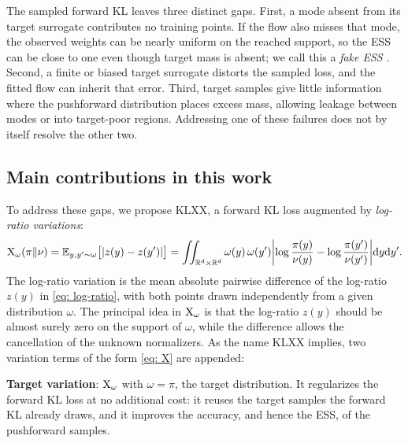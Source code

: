 \documentclass{article}
\begin{document}
The sampled forward KL leaves three distinct gaps. First, a mode absent from its target surrogate contributes no training points. If the flow also misses that mode, the observed weights can be nearly uniform on the reached support, so the ESS can be close to one even though target mass is absent; we call this a \emph{fake ESS} \citep{noe2019boltzmann,midgley2022flow}. Second, a finite or biased target surrogate distorts the sampled loss, and the fitted flow can inherit that error. Third, target samples give little information where the pushforward distribution places excess mass, allowing leakage between modes or into target-poor regions. Addressing one of these failures does not by itself resolve the other two.

\subsection{Main contributions in this work}
To address these gaps, we propose KLXX, a forward KL loss augmented by \emph{log-ratio variations}:
\begin{equation}
	\mathrm{X}_\omega(\pi\|\nu) = \mathbb E_{y,y'\sim \omega} \big[|z(y)-z(y')|\big] = \iint_{\mathbb R^d\times\mathbb R^d} \omega(y)\,\omega(y')
	\biggl|\log\frac{\pi(y)}{\nu(y)} - \log\frac{\pi(y')}{\nu(y')}\biggr| \mathrm{d} y\mathrm{d} y'.
	\label{eq: X}
\end{equation}
The log-ratio variation is the mean absolute pairwise difference of the log-ratio $z(y)$ in \eqref{eq: log-ratio}, with both points drawn independently from a given distribution $\omega$.
The principal idea in $\mathrm{X}_\omega$ is that the log-ratio $z(y)$ should be {\color{blue}almost surely zero on the support of $\omega$}, while the difference allows the cancellation of the unknown normalizers.
As the name KLXX implies, two variation terms of the form \eqref{eq: X} are appended:

\textbf{Target variation}: $\mathrm{X}_\omega$ with $\omega = \pi$, the target distribution. It regularizes the forward KL loss at no additional cost: it reuses the target samples the forward KL already draws, and it improves the accuracy, and hence the ESS, of the pushforward samples.
\end{document}
